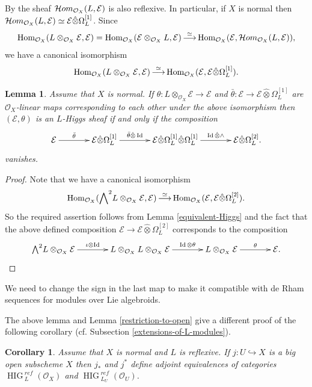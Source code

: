\documentclass[12pt]{article}
\theoremstyle{plain}
\newtheorem{Corollary}[Thm]{\sc Corollary}
\newtheorem{Lemma}[Thm]{\sc Lemma}
\theoremstyle{definition}
\theoremstyle{remark}
\newcommand{\cE}{{\mathcal E}}
\newcommand{\cO}{{\mathcal O}}
\newcommand{\Hig}{{\mathop{\operatorname{HIG}\, }}}
\newcommand{\Hom}{{\mathop{{\rm Hom}}}}
\newcommand{\cHom}{{\mathop{{\cal H}om}}}
\newcommand{\id}{\mathop{\rm Id}}
\begin{document}
By \cite[Lemma 0AY4]{SP} the sheaf $\cHom_{\cO_X}(L, \cE)$ is also reflexive. In particular, if $X$ is  normal  
then $\cHom_{\cO_X}(L, \cE)\simeq \cE\hat{\otimes} \Omega_L^{[1]}$. Since
$$\Hom _{\cO_X} (L\otimes _{\cO_X} \cE, \cE)=\Hom _{\cO_X} (\cE\otimes _{\cO_X} L, \cE)\mathop{\longrightarrow}^{\simeq}\Hom _{\cO_X}
(\cE, \cHom_{\cO_X}(L, \cE)),$$
we have a canonical isomorphism
$$\Hom _{\cO_X} (L\otimes _{\cO_X} \cE, \cE)\mathop{\longrightarrow}^{\simeq}\Hom _{\cO_X}
(\cE, \cE\hat{\otimes} \Omega_L^{[1]}).$$

\begin{Lemma}\label{comparison-of-dual-definitions}
Assume that $X$ is normal.
If $\theta : L\otimes _{\cO_X} \cE\to \cE$ and $\bar\theta: \cE\to \cE\hat{\otimes} \Omega_L^{[1]}$ are $\cO_X$-linear maps corresponding to each other under the above isomorphism then
	$(\cE, \theta)$ is an $L$-Higgs sheaf if and only if the composition
	$$\xymatrixcolsep{3pc}\xymatrix{
		\cE\ar[r]^-{\bar\theta}& \cE\hat{\otimes} \Omega_L^{[1]}\ar[r]^-{\bar\theta\hat{\otimes }\id}&
		\cE\hat{\otimes} \Omega_L^{[1]}\hat{\otimes} \Omega_L^{[1]}\ar[r]^-{\id \hat{\otimes}\wedge}&
		\cE\hat{\otimes} \Omega_L^{[2]}.\\
	}
	$$
	vanishes. 
\end{Lemma}

\begin{proof}
Note that we have a  canonical isomorphism
$$\Hom _{\cO_X} ({\bigwedge}^2L\otimes _{\cO_X} \cE, \cE)\mathop{\longrightarrow}^{\simeq}\Hom _{\cO_X}
(\cE, \cE\hat{\otimes} \Omega_L^{[2]}).$$
So the required assertion follows from Lemma \ref{equivalent-Higgs} and the fact that the above defined composition $\cE\to	\cE\hat{\otimes} \Omega_L^{[2]}$ corresponds to the composition
	$$\xymatrixcolsep{3pc}\xymatrix{
	{\bigwedge}^2L\otimes _{\cO_X}	\cE\ar[r]^-{\iota \otimes \id }& L\otimes _{\cO_X}L\otimes _{\cO_X} \cE \ar[r]^-{\id{\otimes }\theta}&
	L\otimes _{\cO_X}\cE\ar[r]^-{\theta }&
	\cE .\\} $$
\end{proof}


We need to change the sign in the last map to make it compatible with de Rham sequences for modules over Lie algebroids.


\medskip

The above lemma and Lemma \ref{restriction-to-open}  give a different proof of the following corollary (cf. Subsection \ref{extensions-of-L-modules}).

\begin{Corollary}
Assume that $X$ is normal and  $L$ is reflexive. 
If $j: U\hookrightarrow X $ is a big open subscheme $X$ then
 $j_*$ and $j^*$ define adjoint equivalences of categories $\Hig^{ref} _L(\cO_X)$ and $\Hig^{ref}_{L_U}(\cO_U)$. 
\end{Corollary}
\end{document}

